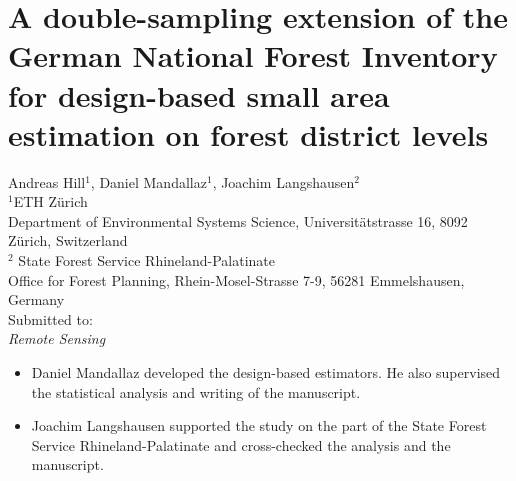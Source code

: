 \chapter{A double-sampling extension of the German National Forest Inventory for design-based small area estimation on forest district levels}
\label{chap:sae}

{\large Andreas Hill$^1$, Daniel Mandallaz$^1$, Joachim Langshausen$^2$}\\

\vspace{3cm}
\noindent
$^1$ETH Z\"urich\\Department of Environmental Systems Science, Universit\"atstrasse 16, 8092 Z\"urich, Switzerland \\
$^2$ State Forest Service Rhineland-Palatinate\\Office for Forest Planning, Rhein-Mosel-Strasse 7-9, 56281 Emmelshausen, Germany \\


\vspace{\fill}
\noindent
Submitted to:\\
\textit{Remote Sensing}

\newpage
\thispagestyle{plain}
\renewcommand{\labelitemi}{--}
\begin{itemize}
	\item Daniel Mandallaz developed the design-based estimators. He also supervised the statistical analysis and writing of the manuscript.
	\item Joachim Langshausen supported the study on the part of the State Forest Service Rhineland-Palatinate and cross-checked the analysis and the manuscript.
\end{itemize}

\clearpage
